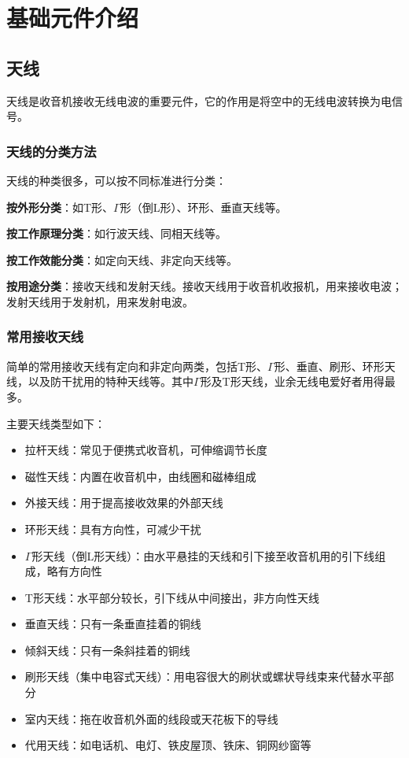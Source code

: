 \documentclass[12pt,UTF8]{ctexbook}
\begin{document}
\chapter{基础元件介绍}
\section{天线}

天线是收音机接收无线电波的重要元件，它的作用是将空中的无线电波转换为电信号。

\subsection{天线的分类方法}

天线的种类很多，可以按不同标准进行分类：

\textbf{按外形分类}：如T形、$\Gamma$形（倒L形）、环形、垂直天线等。

\textbf{按工作原理分类}：如行波天线、同相天线等。

\textbf{按工作效能分类}：如定向天线、非定向天线等。

\textbf{按用途分类}：接收天线和发射天线。接收天线用于收音机收报机，用来接收电波；发射天线用于发射机，用来发射电波。

\subsection{常用接收天线}

简单的常用接收天线有定向和非定向两类，包括T形、$\Gamma$形、垂直、刷形、环形天线，以及防干扰用的特种天线等。其中$\Gamma$形及T形天线，业余无线电爱好者用得最多。

主要天线类型如下：

\begin{itemize}[leftmargin=3.5em]
\item 拉杆天线：常见于便携式收音机，可伸缩调节长度
\item 磁性天线：内置在收音机中，由线圈和磁棒组成
\item 外接天线：用于提高接收效果的外部天线
\item 环形天线：具有方向性，可减少干扰
\item $\Gamma$形天线（倒L形天线）：由水平悬挂的天线和引下接至收音机用的引下线组成，略有方向性
\item T形天线：水平部分较长，引下线从中间接出，非方向性天线
\item 垂直天线：只有一条垂直挂着的铜线
\item 倾斜天线：只有一条斜挂着的铜线
\item 刷形天线（集中电容式天线）：用电容很大的刷状或螺状导线束来代替水平部分
\item 室内天线：拖在收音机外面的线段或天花板下的导线
\item 代用天线：如电话机、电灯、铁皮屋顶、铁床、铜网纱窗等
\end{itemize}
\end{document}
